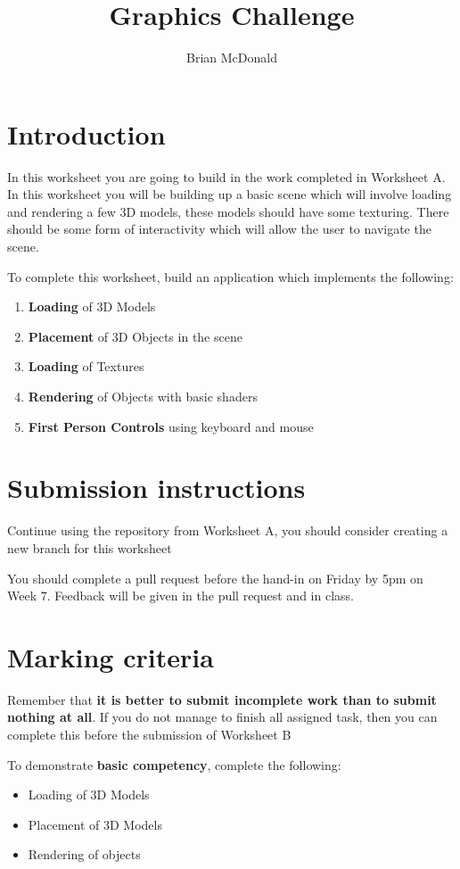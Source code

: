 \documentclass{../../../fal_assignment}
\title{Graphics Challenge}
\author{Brian McDonald}
\begin{document}
\maketitle

\section*{Introduction}

In this worksheet you are going to build in the work completed in Worksheet A. In this worksheet you will be building up a basic scene which will involve loading and rendering a few 3D models, these models should have some texturing. There should be some form of interactivity which will allow the user to navigate the scene.

To complete this worksheet, build an application which implements the following:
\begin{enumerate}[label=(\alph*)]
	\item \textbf{Loading} of 3D Models
	\item \textbf{Placement} of 3D Objects in the scene
	\item \textbf{Loading} of Textures
	\item \textbf{Rendering} of Objects with basic shaders
	\item \textbf{First Person Controls} using keyboard and mouse
\end{enumerate}

\section*{Submission instructions}

Continue using the repository from Worksheet A, you should consider creating a new branch for this worksheet

You should complete a pull request before the hand-in on Friday by 5pm on Week 7. Feedback will be given in the pull request and in class.

\section*{Marking criteria}

Remember that \textbf{it is better to submit incomplete work than to submit nothing at all}. If you do not manage to finish all assigned task, then you can complete this before the submission of Worksheet B

To demonstrate \textbf{basic competency}, complete the following:
\begin{itemize}
	\item Loading of 3D Models
	\item Placement of 3D Models
	\item Rendering of objects
\end{itemize} 
\end{document}
